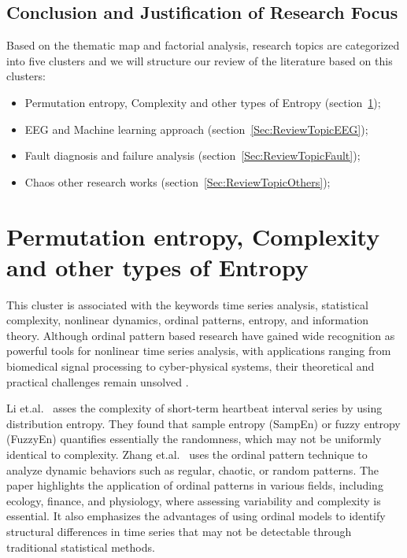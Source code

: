\subsection{Conclusion and Justification of Research Focus}

Based on the thematic map and factorial analysis, research topics are categorized into five clusters and we will structure our review of the literature based on this clusters:

\begin{itemize}
	\item Permutation entropy, Complexity and other types of Entropy (section~\ref{Sec:ReviewTopicPE});
	\item EEG and Machine learning approach (section~\ref{Sec:ReviewTopicEEG});
	\item Fault diagnosis and failure analysis (section~\ref{Sec:ReviewTopicFault});
	\item Chaos other research works (section~\ref{Sec:ReviewTopicOthers});
\end{itemize}

\section{Permutation entropy, Complexity and other types of Entropy}\label{Sec:ReviewTopicPE}
This cluster is associated with the keywords time series analysis, statistical complexity, nonlinear dynamics, ordinal patterns, entropy, and information theory. Although ordinal pattern based research have gained wide recognition as powerful tools for nonlinear time series analysis, with applications ranging from biomedical signal processing to cyber-physical systems, their theoretical and practical challenges remain unsolved \cite{Keller2017, Zanin2012}. 

Li et.al.~\cite{Li2015e} asses the complexity of short-term heartbeat interval series by using distribution entropy. They found that sample entropy (SampEn) or fuzzy entropy (FuzzyEn) quantifies essentially the randomness, which may not be uniformly identical to complexity. Zhang et.al.~\cite{Zhang2018d} uses the ordinal pattern technique to analyze dynamic behaviors such as regular, chaotic, or random patterns. The paper highlights the application of ordinal patterns in various fields, including ecology, finance, and physiology, where assessing variability and complexity is essential. It also emphasizes the advantages of using ordinal models to identify structural differences in time series that may not be detectable through traditional statistical methods.

